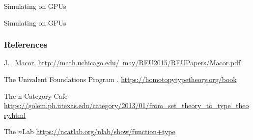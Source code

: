 \documentclass[10pt]{beamer}
\begin{document}
\begin{frame}{Simulating on GPUs}

\end{frame}


\begin{frame}{Simulating on GPUs}

\end{frame}



\begin{frame}
\frametitle{References}
\begin{thebibliography}{}
J. ~Macor.
\newblock \href{http://math.uchicago.edu/~may/REU2015/REUPapers/Macor.pdf}{\footnotesize http://math.uchicago.edu/~may/REU2015/REUPapers/Macor.pdf}


The {Univalent Foundations Program}
.
\newblock \href{https://homotopytypetheory.org/book}{\footnotesize https://homotopytypetheory.org/book}

    The n-Category Caf$\acute{\text{e}}$
\newblock \href{https://golem.ph.utexas.edu/category/2013/01/from_set_theory_to_type_theory.html}{\footnotesize https://golem.ph.utexas.edu/category/2013/01/from\_set\_theory\_to\_type\_theory.html}

The $n$Lab
\newblock \href{https://ncatlab.org/nlab/show/function+type}{\footnotesize https://ncatlab.org/nlab/show/function+type}

\end{thebibliography}
\end{frame}
\end{document}
